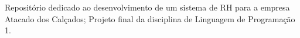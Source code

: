 Repositório dedicado ao desenvolvimento de um sistema de RH para a empresa Atacado dos Calçados; Projeto final da disciplina de Linguagem de Programação 1. 